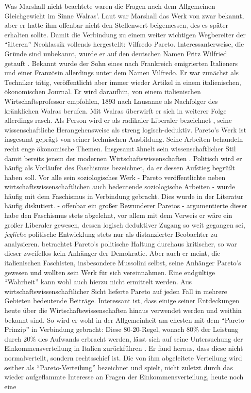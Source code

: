 Was Marshall nicht beachtete waren die Fragen nach dem Allgemeinen Gleichgewicht im Sinne Walras'. Laut \textcite[S. 360]{Rosner2012} war Marshall das Werk von \textcite{Walras1874} zwar bekannt, aber er hatte ihm offenbar nicht den Stellenwert beigemessen, des es später erhalten sollte. Damit die Verbindung zu einem weiter wichtigen Wegbereiter der "`älteren"' Neoklassik vollends hergestellt: Vilfredo Pareto. Interessanterweise, die Gründe sind unbekannt, wurde er auf den deutschen Namen Fritz Wilfried getauft \parencite[S. 158]{Eisermann1989}. Bekannt wurde der Sohn eines nach Frankreich emigrierten Italieners und einer Französin allerdings unter dem Namen Vilfredo. Er war zunächst als Techniker tätig, veröffentlicht aber immer wieder Artikel in einem italienischen, ökonomischen Journal. Er wird daraufhin, von einem italienischen Wirtschaftsprofessor empfohlen, 1893 nach Lausanne als Nachfolger des kränklichen Walras berufen. Mit Walras überwirft er sich in weiterer Folge allerdings rasch. Als Person wird er als radikaler Liberaler bezeichnet \parencite{Cirillo1983}, seine wissenschaftliche Herangehensweise als streng logisch-deduktiv.  Pareto's Werk ist insgesamt geprägt von seiner technischen Ausbildung. Seine Arbeiten behandeln recht enge ökonomische Themen. Insgesamt ähnelt sein wissenschaftlicher Stil damit bereits jenem der modernen Wirtschaftswissenschaften \parencite[S. 362]{Rosner2012}. Politisch wird er häufig als Vorläufer des Faschismus bezeichnet, da er dessen Aufstieg begrüßt haben soll. Vor alle sein soziologisches Werk - Pareto veröffentlichte neben wirtschaftswissenschaftlichen auch bedeutende soziologische Arbeiten - wurde häufig mit dem Faschismus in Verbindung gebracht. Dies wurde in der Literatur häufig diskutiert. \textcite[S. 162]{Eisermann1989} - offenbar ein großer Bewunderer Paretos - argumentierte dieser habe den Faschismus stets abgelehnt, vor allem mit dem Verweis er wäre ein großer Liberaler gewesen, dessen logisch deduktiver Zugang so weit gegangen sei, \textit{jegliche} politische Entwicklung stets nur als distanzierter Beobachter zu analysieren. \textcite{Cirillo1983} betrachtet Pareto's politische Haltung durchaus kritischer, so war dieser zweifellos kein Anhänger der Demokratie. Aber auch er meint, die italienischen Faschisten, insbesondere Mussolini selbst, seine Anhänger Pareto's gewesen und wollten sein Werk für sich vereinnahmen. Eine endgültige "`Wahrheit"' kann wohl auch hierzu nicht ermittelt werden. Aus wirtschaftswissenschaftlicher Sicht lieferte Pareto auf jeden Fall in mehrere Gebieten bedeutende Beiträge. Interessant ist, dass einige seiner Entdeckungen heute über die Wirtschaftswissenschaften hinaus verwendet werden und weithin bekannt sind. So wird er wohl in der Allgemeinheit am ehesten mit dem  "`Pareto-Prinzip"' in Verbindung gebracht: Diese 80-20-Regel, wonach 80\% der Leistung durch 20\% des Aufwands erbracht werden, lässt sich auf seine Untersuchung der Einkommensverteilung in Italien zurückführen \parencite{Pareto1896}. Er fand heraus, dass diese nicht normalverteilt, sondern rechtsschief ist. Die von ihm abgeleitete Verteilung wird seither als "`Pareto-Verteilung"' bezeichnet und spielt, nicht zuletzt durch das wieder aufgeflammte Interesse an Fragen der Einkommensverteilung\parencite{Persky1992}, heute noch eine 